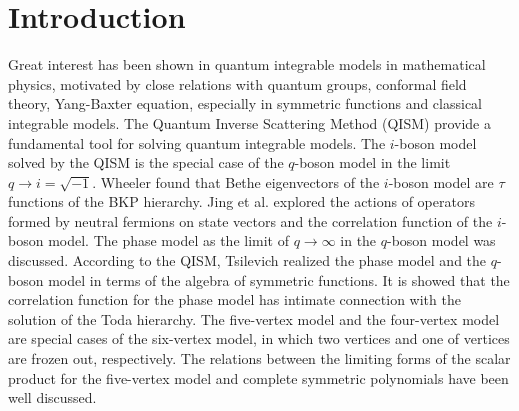 \documentclass[11pt,reqno]{amsart}
\numberwithin{equation}{section}
\begin{document}
\section{Introduction}
Great interest has been shown in quantum integrable models in mathematical physics, motivated by close relations with quantum groups\cite{quantum-groups}, conformal field theory\cite{conformal-field},   Yang-Baxter equation\cite{Yang-Baxter-1,Yang-Baxter-2}, especially in symmetric functions\cite{Mac} and classical integrable models\cite{BKP-1,BKP-2,V.G.,Jimbo1981}. The Quantum Inverse Scattering Method (QISM)\cite{QISM-1,QISM-2}  provide a fundamental tool for solving quantum integrable models. The $i$-boson model solved by the QISM is the special case of the $q$-boson model\cite{q-boson} in the limit $q \to i=\sqrt{-1}$.
Wheeler\cite{boshilunwen} found that Bethe eigenvectors of the $i$-boson model are  $\tau$ functions of the BKP hierarchy. Jing et al.\cite{i-boson} explored the actions of  operators formed by neutral fermions on state vectors and the correlation function of the $i$-boson model. The phase model as the limit of $q \to \infty$  in the $q$-boson model was discussed\cite{q-boson,B97}. According to the QISM, Tsilevich\cite{q-boson-hall-little} realized the phase model and the $q$-boson model in terms of the algebra of symmetric functions.  It is showed that the correlation function for the phase model has intimate connection with the  solution of the Toda hierarchy\cite{Q-boson}. The five-vertex model  and the four-vertex model  are special cases of the six-vertex model\cite{six}, in which  two vertices and one of vertices are frozen out, respectively. The relations between the limiting  forms of the scalar product for the five-vertex model and complete symmetric polynomials have been well discussed\cite{five}.
	
\end{document}
